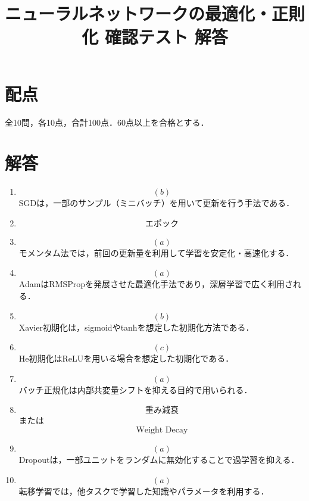 \documentclass[uplatex,a4paper,12pt]{jsarticle}
\begin{document}
\title{ニューラルネットワークの最適化・正則化 確認テスト 解答}
\author{}
\date{}
\maketitle

\section*{配点}
全10問，各10点，合計100点．60点以上を合格とする．

\section*{解答}

\begin{enumerate}

\item
\[
\boxed{(b)}
\]
SGDは，一部のサンプル（ミニバッチ）を用いて更新を行う手法である．

\item
\[
\boxed{\text{エポック}}
\]

\item
\[
\boxed{(a)}
\]
モメンタム法では，前回の更新量を利用して学習を安定化・高速化する．

\item
\[
\boxed{(a)}
\]
AdamはRMSPropを発展させた最適化手法であり，深層学習で広く利用される．

\item
\[
\boxed{(b)}
\]
Xavier初期化は，sigmoidやtanhを想定した初期化方法である．

\item
\[
\boxed{(c)}
\]
He初期化はReLUを用いる場合を想定した初期化である．

\item
\[
\boxed{(a)}
\]
バッチ正規化は内部共変量シフトを抑える目的で用いられる．

\item
\[
\boxed{\text{重み減衰}}
\]
または
\[
\boxed{\text{Weight Decay}}
\]

\item
\[
\boxed{(a)}
\]
Dropoutは，一部ユニットをランダムに無効化することで過学習を抑える．

\item
\[
\boxed{(a)}
\]
転移学習では，他タスクで学習した知識やパラメータを利用する．

\end{enumerate}
\end{document}
